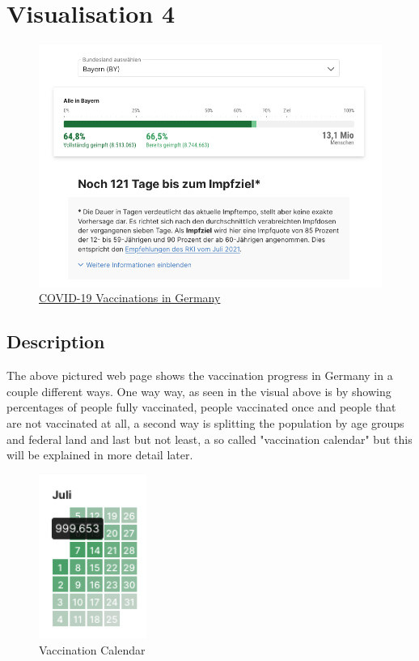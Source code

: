 \documentclass[12pt, letterpaper]{article}
\begin{document}
\section{Visualisation 4}
\begin{figure}[h]
    \centering
    \includegraphics[width=400pt]{images/morgenpost.png}
    \caption{
    \href{https://interaktiv.morgenpost.de/corona-impfungen-deutschland-bundeslaender-weltweit/}{COVID-19 Vaccinations in Germany}}
    \label{fig:my_label}
\end{figure}
\newpage

\subsection{Description}
The above pictured web page shows the vaccination progress in Germany in a couple different ways. One way way, as seen in the visual above is by showing percentages of people fully vaccinated, people vaccinated once and people that are not vaccinated at all, a second way is splitting the population by age groups and federal land and last but not least, a so called "vaccination calendar" but this will be explained in more detail later.
\begin{figure}[h]
    \centering
    \includegraphics[width=100pt]{images/calendar.png}
    \caption{Vaccination Calendar}
    \label{fig:my_label}
\end{figure}
\end{document}
